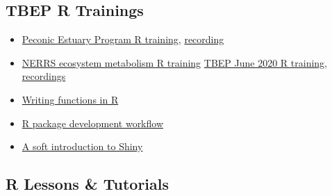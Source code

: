 \documentclass[
  letterpaper,
  DIV=11,
  numbers=noendperiod]{scrreprt}
\providecommand{\tightlist}{%
  \setlength{\itemsep}{0pt}\setlength{\parskip}{0pt}}\usepackage{longtable,booktabs,array}
\begin{document}
\hypertarget{tbep-r-trainings}{%
\subsection*{TBEP R Trainings}\label{tbep-r-trainings}}

\begin{itemize}
\tightlist
\item
  \href{https://tbep-tech.github.io/pep-r-training}{Peconic Estuary
  Program R training},
  \href{https://drive.google.com/file/d/1ZjVHFrVpw2uTKZw-BmD29umdbl6viutM/view?usp=sharing}{recording}
\item
  \href{https://tbep-tech.github.io/ecometab-r-training}{NERRS ecosystem
  metabolism R training}
  \href{https://tbep-tech.github.io/tbep-r-training/}{TBEP June 2020 R
  training},
  \href{https://www.youtube.com/watch?v=_RI4XMRWeV0\&list=PLfJ6-D-exF9RM5TPtT4T0nxieqpr_R4pJ}{recordings}
\item
  \href{https://tbep-tech.github.io/tbep-r-training/functions.html}{Writing
  functions in R}
\item
  \href{https://tbep-tech.github.io/tbep-r-training/packages.html}{R
  package development workflow}
\item
  \href{https://tbep-tech.github.io/tbep-r-training/shiny.html}{A soft
  introduction to Shiny}
\end{itemize}

\hypertarget{r-lessons-tutorials}{%
\subsection*{R Lessons \& Tutorials}\label{r-lessons-tutorials}}
\end{document}
